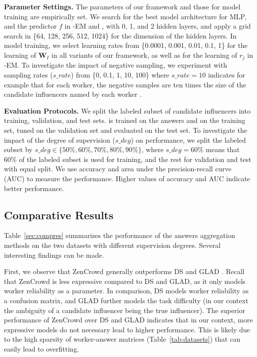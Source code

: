 \smallskip
\noindent\textbf{Parameter Settings.} The parameters of our framework and those for model training are empirically set. We search for the best model architecture for MLP, and the predictor $f$ in \sys-EM and \sys, with 0, 1, and 2 hidden layers, and apply a grid search in \{64, 128, 256, 512, 1024\} for the dimension of the hidden layers. In model training, we select learning rates from \{0.0001, 0.001, 0.01, 0.1, 1\} for the learning of $\mathbf{W}_I$ in all variants of our framework, as well as for the learning of $r_j$ in \sys-EM. To investigate the impact of negative sampling, we experiment with sampling rates ($s\_rate$) from \{0, 0.1, 1, 10, 100\} where $s\_rate=10$ indicates for example that for each worker, the negative samples are ten times the size of the candidate influencers named by each worker . 

\smallskip
\noindent\textbf{Evaluation Protocols.} We split the labeled subset of candidate influencers into training, validation, and test sets. \sys is trained on the answers and on the training set, tuned on the validation set and evaluated on the test set. To investigate the impact of the degree of supervision ($s\_deg$) on \sys performance, we split the labeled subset by $s\_deg\in \{50\%, 60\%, 70\%, 80\%, 90\%\}$, where $s\_deg = 60\%$ means that 60\% of the labeled subset is used for training, and the rest for validation and test with equal split. We use accuracy and area under the precision-recall curve (AUC) to measure the performance. Higher values of accuracy and AUC indicate better performance.



\subsection{Comparative Results}
Table~\ref{sec:compres} summarizes the performance of the answers aggregation methods on the two datasets with different supervision degrees. Several interesting findings can be made.

First, we observe that ZenCrowd generally outperforms DS and GLAD . Recall that ZenCrowd is less expressive compared to DS and GLAD, as it only models worker reliability as a parameter. In comparison, DS models worker reliability as a confusion matrix, and GLAD further models the task difficulty (in our context the ambiguity of a candidate influencer being the true influencer). The superior performance of ZenCrowd  over DS and GLAD indicates that in our context, more expressive models do not necessary lead to higher performance. This is likely due to the high sparsity of worker-answer matrices (Table~\ref{tab:datasets}) that can easily lead to overfitting.

